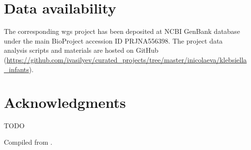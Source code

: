 \documentclass[12pt,a4paper]{article}
\begin{document}
\section{Data availability}\label{sec:data}
The corresponding \gls{wgs} project has been deposited at NCBI GenBank database under the main
BioProject accession ID PRJNA556398.
The project data analysis scripts and materials are hosted on GitHub
(\url{https://github.com/ivasilyev/curated_projects/tree/master/inicolaeva/klebsiella_infants}).

\section{Acknowledgments}\label{sec:acks}
TODO

\printbibliography

\newpage


\newpage


\newpage

\vfill
Compiled from \LaTeXe{}.
\end{document}
